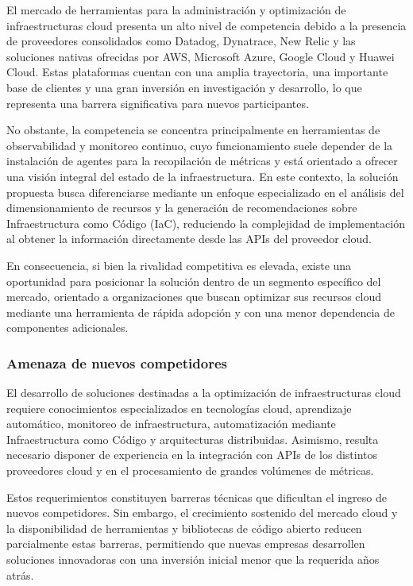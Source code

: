 El mercado de herramientas para la administración y optimización de infraestructuras cloud presenta un alto nivel de competencia debido a la presencia de proveedores consolidados como Datadog, Dynatrace, New Relic y las soluciones nativas ofrecidas por AWS, Microsoft Azure, Google Cloud y Huawei Cloud. Estas plataformas cuentan con una amplia trayectoria, una importante base de clientes y una gran inversión en investigación y desarrollo, lo que representa una barrera significativa para nuevos participantes.

No obstante, la competencia se concentra principalmente en herramientas de observabilidad y monitoreo continuo, cuyo funcionamiento suele depender de la instalación de agentes para la recopilación de métricas y está orientado a ofrecer una visión integral del estado de la infraestructura. En este contexto, la solución propuesta busca diferenciarse mediante un enfoque especializado en el análisis del dimensionamiento de recursos y la generación de recomendaciones sobre Infraestructura como Código (IaC), reduciendo la complejidad de implementación al obtener la información directamente desde las APIs del proveedor cloud.

En consecuencia, si bien la rivalidad competitiva es elevada, existe una oportunidad para posicionar la solución dentro de un segmento específico del mercado, orientado a organizaciones que buscan optimizar sus recursos cloud mediante una herramienta de rápida adopción y con una menor dependencia de componentes adicionales.

\subsubsection{Amenaza de nuevos competidores}

El desarrollo de soluciones destinadas a la optimización de infraestructuras cloud requiere conocimientos especializados en tecnologías cloud, aprendizaje automático, monitoreo de infraestructura, automatización mediante Infraestructura como Código y arquitecturas distribuidas. Asimismo, resulta necesario disponer de experiencia en la integración con APIs de los distintos proveedores cloud y en el procesamiento de grandes volúmenes de métricas.

Estos requerimientos constituyen barreras técnicas que dificultan el ingreso de nuevos competidores. Sin embargo, el crecimiento sostenido del mercado cloud y la disponibilidad de herramientas y bibliotecas de código abierto reducen parcialmente estas barreras, permitiendo que nuevas empresas desarrollen soluciones innovadoras con una inversión inicial menor que la requerida años atrás.

